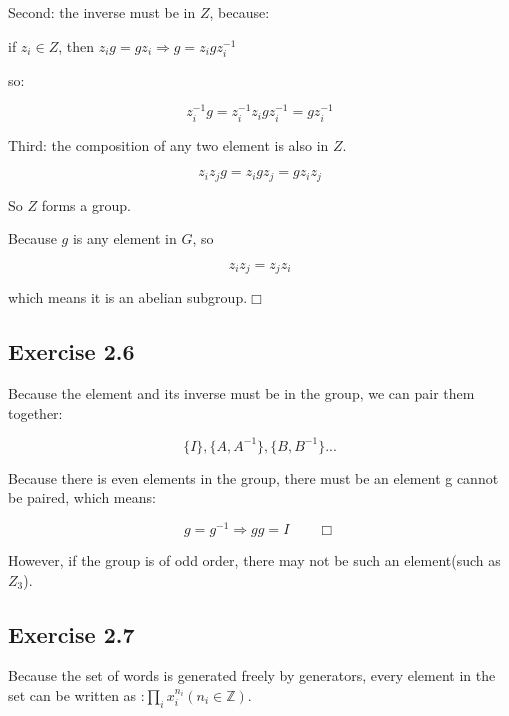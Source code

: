 \documentclass[]{ctexart}
\begin{document}
    Second: the inverse must be in $Z$, because:
    
    if $z_i\in Z$, then $z_ig=gz_i \Rightarrow g=z_igz_i^{-1}$
    
    so:
    
    \begin{equation*}
    	z_i^{-1}g=z_i^{-1}z_igz_i^{-1}=gz_i^{-1}
    \end{equation*}
    
    Third: the composition of any two element is also in $Z$. 
    
    \begin{equation*}
    	z_iz_jg=z_igz_j=gz_iz_j
    \end{equation*}
    
    So $Z$ forms a group. 
    
    Because $g$ is any element in $G$, so 
    
    \begin{equation*}
    	z_iz_j=z_jz_i
    \end{equation*}
    
    which means it is an abelian subgroup.$\Box$ 
    
    \subsection{Exercise 2.6}
    Because the element and its inverse must be in the group, we can pair them together:
    
    \begin{equation*}
    	\{I\},\{A,A^{-1}\},\{B,B^{-1}\}...
    \end{equation*}
    
    Because there is even elements in the group, there must be an element g cannot be paired, which means:
    
    \begin{equation*}
    	g=g^{-1} \Rightarrow gg=I \qquad \Box
    \end{equation*}
    
    However, if the group is of odd order, there may not be such an element(such as $Z_3$). 
    
    \subsection{Exercise 2.7}
    Because the set of words is generated freely by generators, every element in the set can be written as :$\prod_i x_i^{n_i}(n_i\in \mathbb{Z})$. 
    
\end{document}
